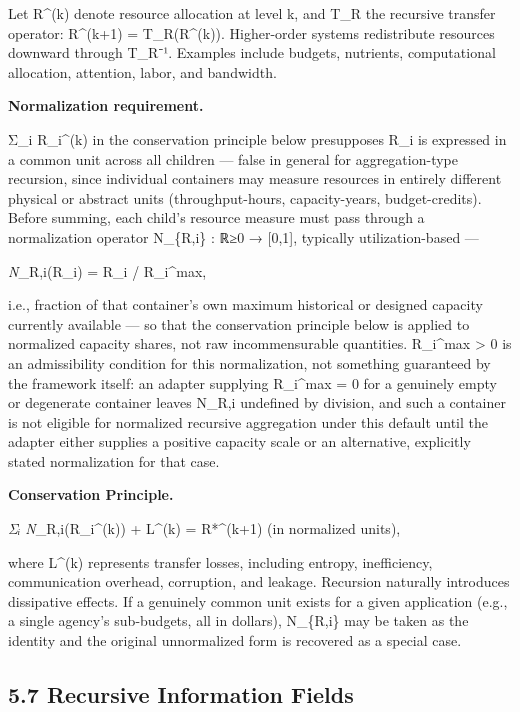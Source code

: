 \documentclass[
]{article}
\begin{document}
Let R\^{}(k) denote resource allocation at level k, and T\_R the
recursive transfer operator: R\^{}(k+1) = T\_R(R\^{}(k)). Higher-order
systems redistribute resources downward through T\_R⁻¹. Examples include
budgets, nutrients, computational allocation, attention, labor, and
bandwidth.

\textbf{Normalization requirement.}

Σ\_i R\_i\^{}(k) in the conservation principle below presupposes R\_i is
expressed in a common unit across all children --- false in general for
aggregation-type recursion, since individual containers may measure
resources in entirely different physical or abstract units
(throughput-hours, capacity-years, budget-credits). Before summing, each
child's resource measure must pass through a normalization operator
N\_\{R,i\} : ℝ≥0 → {[}0,1{]}, typically utilization-based ---

\emph{N}\_R,i(R\_i) = R\_i / R\_i\^{}max,

i.e., fraction of that container's own maximum historical or designed
capacity currently available --- so that the conservation principle
below is applied to normalized capacity shares, not raw incommensurable
quantities. R\_i\^{}max \textgreater{} 0 is an admissibility condition
for this normalization, not something guaranteed by the framework
itself: an adapter supplying R\_i\^{}max = 0 for a genuinely empty or
degenerate container leaves N\_R,i undefined by division, and such a
container is not eligible for normalized recursive aggregation under
this default until the adapter either supplies a positive capacity scale
or an alternative, explicitly stated normalization for that case.

\textbf{Conservation Principle.}

\emph{Σᵢ N}\_R,i(R\_i\^{}(k)) + L\^{}(k) = R*\^{}(k+1) (in normalized
units),

where L\^{}(k) represents transfer losses, including entropy,
inefficiency, communication overhead, corruption, and leakage. Recursion
naturally introduces dissipative effects. If a genuinely common unit
exists for a given application (e.g., a single agency's sub-budgets, all
in dollars), N\_\{R,i\} may be taken as the identity and the original
unnormalized form is recovered as a special case.

\hypertarget{recursive-information-fields}{%
\subsection{5.7 Recursive Information
Fields}\label{recursive-information-fields}}
\end{document}
